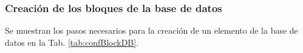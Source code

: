 \subsubsection{Creación de los bloques de la base de datos}
Se muestran los pasos necesarios para la creación de un elemento
de la base de datos en la Tab. \ref{tab:confBlockDB}.
